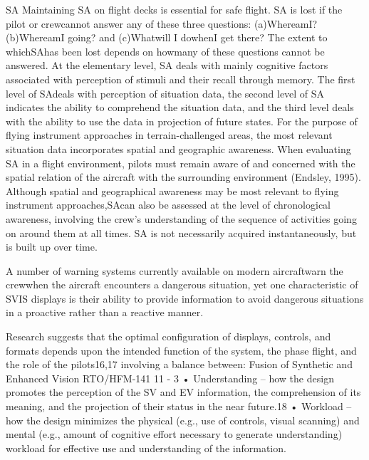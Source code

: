 \documentclass[utf8,bachelor,manualbib]{gradu3}
\begin{document}
SA
Maintaining SA on flight decks is essential for safe flight. SA is lost if the pilot or
crewcannot answer any of these three questions: (a)WhereamI? (b)WhereamI going?
and (c)Whatwill I dowhenI get there? The extent to whichSAhas been lost depends
on howmany of these questions cannot be answered. At the elementary level,
SA deals with mainly cognitive factors associated with perception of stimuli and
their recall through memory. The first level of SAdeals with perception of situation
data, the second level of SA indicates the ability to comprehend the situation data,
and the third level deals with the ability to use the data in projection of future states.
For the purpose of flying instrument approaches in terrain-challenged areas, the
most relevant situation data incorporates spatial and geographic awareness. When
evaluating SA in a flight environment, pilots must remain aware of and concerned
with the spatial relation of the aircraft with the surrounding environment (Endsley,
1995). Although spatial and geographical awareness may be most relevant to flying
instrument approaches,SAcan also be assessed at the level of chronological awareness,
involving the crew’s understanding of the sequence of activities going on
around them at all times. SA is not necessarily acquired instantaneously, but is built
up over time. \citep{schnell2004}

A number of
warning systems currently available on modern aircraftwarn the crewwhen the aircraft
encounters a dangerous situation, yet one characteristic of SVIS displays is
their ability to provide information to avoid dangerous situations in a proactive
rather than a reactive manner. \citep{schnell2004}

Research suggests that the optimal configuration of displays, controls, and formats depends upon the intended
function of the system, the phase flight, and the role of the pilots16,17 involving a balance between:
Fusion of Synthetic and Enhanced Vision
RTO/HFM-141 11 - 3
• Understanding – how the design promotes the perception of the SV and EV information, the
comprehension of its meaning, and the projection of their status in the near future.18
• Workload – how the design minimizes the physical (e.g., use of controls, visual scanning) and mental
(e.g., amount of cognitive effort necessary to generate understanding) workload for effective use and
understanding of the information.  \citep{baileyym2007}
\end{document}

